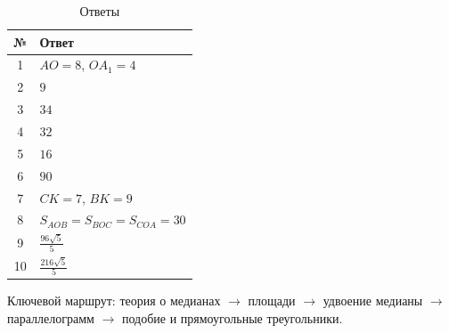 \documentclass[a4paper,12pt]{article}
\begin{document}
\begin{table}[h]

\centering

\caption{Ответы}

\renewcommand{\arraystretch}{1.45}

\begin{tabularx}{\linewidth}{@{}cX@{}}

\toprule
\textbf{№} & \textbf{Ответ} \\
\midrule

1
&
$AO=8$, \quad $OA_1=4$
\\

2
&
$9$
\\

3
&
$34$
\\

4
&
$32$
\\

5
&
$16$
\\

6
&
$90$
\\

7
&
$CK=7$, \quad $BK=9$
\\

8
&
$S_{AOB}=S_{BOC}=S_{COA}=30$
\\

9
&
$\displaystyle \frac{96\sqrt5}{5}$
\\

10
&
$\displaystyle \frac{216\sqrt5}{5}$
\\

\bottomrule

\end{tabularx}

\end{table}

\vfill

\begin{center}
{\small\color{softgray}
Ключевой маршрут:
теория о медианах
$\to$
площади
$\to$
удвоение медианы
$\to$
параллелограмм
$\to$
подобие и прямоугольные треугольники.
}
\end{center}
\end{document}
